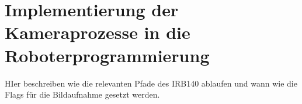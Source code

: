 \chapter{Implementierung der Kameraprozesse in die Roboterprogrammierung}

HIer beschreiben wie die relevanten Pfade des IRB140 ablaufen und wann wie die Flags für die Bildaufnahme gesetzt werden. 